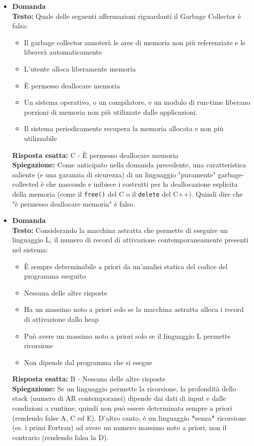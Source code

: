 \documentclass[12pt, a4paper]{article}
\newcounter{domandateoria}
\begin{document}
\begin{itemize}
\newpage

    \item {}\textbf{Domanda \thedomandateoria} \\
    \textbf{Testo:} Quale delle seguenti affermazioni riguardanti il Garbage Collector è falsa:
    \begin{itemize}
        \item[A)] Il garbage collector annoterà le aree di memoria non più referenziate e le libererà automaticamente
        \item[B)] L'utente alloca liberamente memoria
        \item[C)] È permesso deallocare memoria
        \item[D)] Un sistema operativo, o un compilatore, e un modulo di run-time liberano porzioni di memoria non più utilizzate dalle applicazioni.
        \item[E)] Il sistema periodicamente recupera la memoria allocata e non più utilizzabile
    \end{itemize}
    \textbf{Risposta esatta:} C - È permesso deallocare memoria \\
    \textbf{Spiegazione:} Come anticipato nella domanda precedente, una caratteristica saliente (e una garanzia di sicurezza) di un linguaggio "puramente" garbage-collected è che nasconde e inibisce i costrutti per la deallocazione esplicita della memoria (come il \texttt{free()} del C o il \texttt{delete} del C++). Quindi dire che "è permesso deallocare memoria" è falso.
    \vspace{0.3cm}

    \item {}\textbf{Domanda \thedomandateoria} \\
    \textbf{Testo:} Considerando la macchina astratta che permette di eseguire un linguaggio L, il numero di record di attivazione contemporaneamente presenti nel sistema:
    \begin{itemize}
        \item[A)] È sempre determinabile a priori da un'analisi statica del codice del programma eseguito
        \item[B)] Nessuna delle altre risposte
        \item[C)] Ha un massimo noto a priori solo se la macchina astratta alloca i record di attivazione dallo heap
        \item[D)] Può avere un massimo noto a priori solo se il linguaggio L permette ricorsione
        \item[E)] Non dipende dal programma che si esegue
    \end{itemize}
    \textbf{Risposta esatta:} B - Nessuna delle altre risposte \\
    \textbf{Spiegazione:} Se un linguaggio permette la ricorsione, la profondità dello stack (numero di AR contemporanei) dipende dai dati di input e dalle condizioni a runtime, quindi non può essere determinata sempre a priori (rendendo false A, C ed E). D'altro canto, è un linguaggio *senza* ricorsione (es. i primi Fortran) ad avere un numero massimo noto a priori, non il contrario (rendendo falsa la D).
    \vspace{0.3cm}


\end{itemize}
\end{document}
